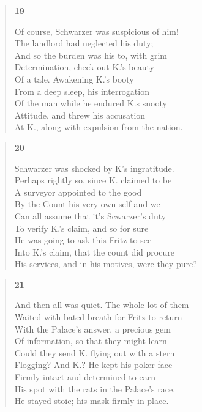 \documentclass{article}
\begin{document}
\begin{verse}
  \begin{center}
    \textbf{19} \\
  \end{center}
  Of course, Schwarzer was suspicious of him! \\
  The landlord had neglected his duty; \\
  And so the burden was his to, with grim \\
  Determination, check out K.'s beauty \\
  Of a tale. Awakening K.'s booty \\
  From a deep sleep, his interrogation \\
  Of the man while he endured K.s snooty \\
  Attitude, and threw his accusation \\
  At K., along with expulsion from the nation.

\end{verse}
\newpage
\begin{verse}
  \begin{center}
      \textbf{20} \\
  \end{center}
    Schwarzer was shocked by K's ingratitude. \\
    Perhaps rightly so, since K. claimed to be \\
    A surveyor appointed to the good \\
    By the Count his very own self and we \\
    Can all assume that it's Scwarzer's duty \\
    To verify K.'s claim, and so for sure \\
    He was going to ask this Fritz to see \\
    Into K.'s claim, that the count did procure \\
    His services, and in his motives, were they pure?
\end{verse}

\begin{verse}
\begin{center}
  \textbf{21} \\
\end{center}
And then all was quiet. The whole lot of them \\
Waited with bated breath for Fritz to return \\
With the Palace's answer, a precious gem \\
Of information, so that they might learn \\
Could they send K. flying out with a stern \\
Flogging? And K.? He kept his poker face \\
Firmly intact and determined to earn \\
His spot with the rats in the Palace's race. \\
He stayed stoic; his mask firmly in place. \\
\end{verse}
\end{document}
